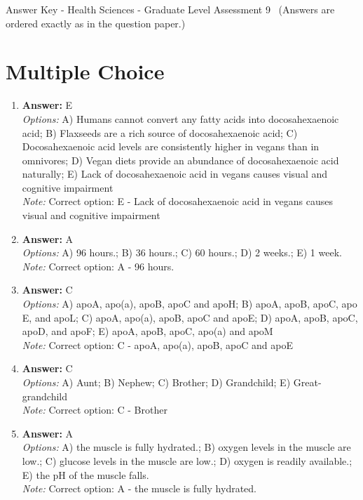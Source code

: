\documentclass[12pt]{article}
\begin{document}
\begin{center}
Answer Key - Health Sciences - Graduate Level Assessment 9 \
\small (Answers are ordered exactly as in the question paper.)
\end{center}

\section*{Multiple Choice}
\begin{enumerate}[label=\arabic*.]
\item \textbf{Answer:} E
\\ \textit{Options:} A) Humans cannot convert any fatty acids into docosahexaenoic acid; B) Flaxseeds are a rich source of docosahexaenoic acid; C) Docosahexaenoic acid levels are consistently higher in vegans than in omnivores; D) Vegan diets provide an abundance of docosahexaenoic acid naturally; E) Lack of docosahexaenoic acid in vegans causes visual and cognitive impairment
\\ \textit{Note:} Correct option: E - Lack of docosahexaenoic acid in vegans causes visual and cognitive impairment
\item \textbf{Answer:} A
\\ \textit{Options:} A) 96 hours.; B) 36 hours.; C) 60 hours.; D) 2 weeks.; E) 1 week.
\\ \textit{Note:} Correct option: A - 96 hours.
\item \textbf{Answer:} C
\\ \textit{Options:} A) apoA, apo(a), apoB, apoC and apoH; B) apoA, apoB, apoC, apo E, and apoL; C) apoA, apo(a), apoB, apoC and apoE; D) apoA, apoB, apoC, apoD, and apoF; E) apoA, apoB, apoC, apo(a) and apoM
\\ \textit{Note:} Correct option: C - apoA, apo(a), apoB, apoC and apoE
\item \textbf{Answer:} C
\\ \textit{Options:} A) Aunt; B) Nephew; C) Brother; D) Grandchild; E) Great-grandchild
\\ \textit{Note:} Correct option: C - Brother
\item \textbf{Answer:} A
\\ \textit{Options:} A) the muscle is fully hydrated.; B) oxygen levels in the muscle are low.; C) glucose levels in the muscle are low.; D) oxygen is readily available.; E) the pH of the muscle falls.
\\ \textit{Note:} Correct option: A - the muscle is fully hydrated.
\end{enumerate}
\end{document}
